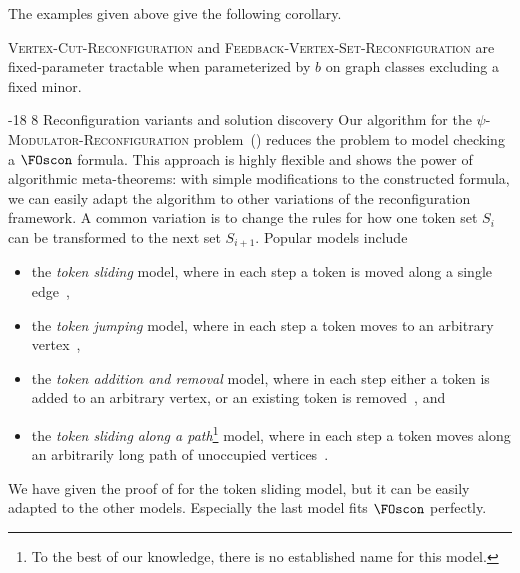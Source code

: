 \documentclass[1p,number,11pt]{elsarticle}
\makeatletter
\renewcommand\subsection{\@startsection{subsection}{2}{\z@}%
  {-18\p@ \@plus -4\p@ \@minus -4\p@}%
  {8\p@ \@plus 4\p@ \@minus 4\p@}%
  {\normalfont\normalsize\bfseries}}
\theoremstyle{plain}
\makeatother
\begin{document}
The examples given above give the following corollary. 
\begin{corollary}
\textsc{Vertex-Cut-Reconfiguration} and \textsc{Feedback-Vertex-Set-Reconfiguration} are fixed-parameter tractable when parameterized by $b$ on graph classes excluding a fixed minor.
\end{corollary}


\subsection{Reconfiguration variants and solution discovery}
Our algorithm for the \textsc{$\psi$-Modulator-Reconfiguration} problem~() reduces the problem to model checking a $\FOscon$ formula.
This approach is highly flexible and shows the power of algorithmic meta-theorems: with simple modifications to the constructed formula, we can easily adapt the algorithm to other variations of the reconfiguration framework.
A common variation is to change the rules for how one token set $S_i$ can be transformed to the next set $S_{i+1}$.
Popular models include
\begin{itemize}
    \item the \emph{token sliding} model, where in each step a token is moved along a single edge~\cite{nishimura18reconfiguration},
    \item the \emph{token jumping} model, where in each step a token moves to an arbitrary vertex~\cite{nishimura18reconfiguration},
    \item the \emph{token addition and removal} model, where
    in each step either a token is added to an arbitrary vertex, or an existing token is removed~\cite{nishimura18reconfiguration}, and
    \item the \emph{token sliding along a path}\footnote{To the best of our knowledge, there is no established name for this model.} model, where in each step a token moves along an arbitrarily long path of unoccupied vertices~\cite{cualinescu2008reconfigurations,cooper2024parameterized}.
\end{itemize}
We have given the proof of  for the token sliding model, but it can be easily adapted to the other models.  
Especially the last model fits $\FOscon$ perfectly. 
\end{document}
